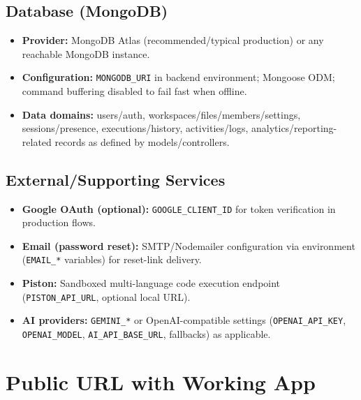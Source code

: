 ﻿\documentclass[11pt,a4paper]{article}
\begin{document}
\subsection{Database (MongoDB)}
\begin{itemize}[leftmargin=*]
  \item \textbf{Provider:} MongoDB Atlas (recommended/typical production) or any reachable MongoDB instance.
  \item \textbf{Configuration:} \texttt{MONGODB\_URI} in backend environment; Mongoose ODM; command buffering disabled to fail fast when offline.
  \item \textbf{Data domains:} users/auth, workspaces/files/members/settings, sessions/presence, executions/history, activities/logs, analytics/reporting-related records as defined by models/controllers.
\end{itemize}

\subsection{External/Supporting Services}
\begin{itemize}[leftmargin=*]
  \item \textbf{Google OAuth (optional):} \texttt{GOOGLE\_CLIENT\_ID} for token verification in production flows.
  \item \textbf{Email (password reset):} SMTP/Nodemailer configuration via environment (\texttt{EMAIL\_*} variables) for reset-link delivery.
  \item \textbf{Piston:} Sandboxed multi-language code execution endpoint (\texttt{PISTON\_API\_URL}, optional local URL).
  \item \textbf{AI providers:} \texttt{GEMINI\_*} or OpenAI-compatible settings (\texttt{OPENAI\_API\_KEY}, \texttt{OPENAI\_MODEL}, \texttt{AI\_API\_BASE\_URL}, fallbacks) as applicable.
\end{itemize}

\section{Public URL with Working App}
\end{document}
